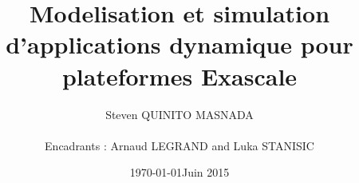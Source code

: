 \documentclass[smallextended]{svjour3}
\date{\today}
\title{}
\begin{document}
\newcommand{\AL}[2][inline]{\todo[color=green!50,#1]{\sf \textbf{AL:} #2}\xspace}
\newcommand{\LS}[2][inline]{\todo[color=green!50,#1]{\sf \textbf{LS:} #2}\xspace}

\let\oldcite=\cite
\renewcommand\cite[2][]{~\ifthenelse{\equal{#1}{}}{\oldcite{#2}}{\oldcite[#1]{#2}}\xspace}
\let\oldref=\ref
\def\ref#1{~\oldref{#1}\xspace}
\def\ie{i.e.,\xspace}
\def\eg{e.g.,\xspace}
\def\qrmspu{\texttt{QRM\_StarPU}\xspace}
\sloppy

\title{Modelisation et simulation d'applications dynamique pour plateformes Exascale%
}


\author{Steven QUINITO MASNADA  \\ \\
        Encadrants : Arnaud LEGRAND and Luka STANISIC  %
}



\date{Juin 2015}

\maketitle
\end{document}

